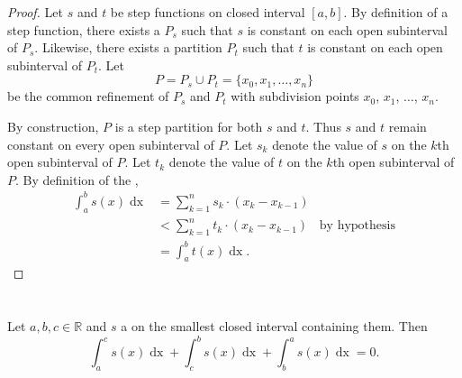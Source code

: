 \documentclass{report}
\begin{document}
\begin{proof}

  Let $s$ and $t$ be step functions on closed interval $[a, b]$.
  By definition of a step function, there exists a 
    $P_s$ such that $s$ is constant on each open subinterval of $P_s$.
  Likewise, there exists a partition $P_t$ such that $t$ is constant on each
    open subinterval of $P_t$.
  Let $$P = P_s \cup P_t = \{x_0, x_1, \ldots, x_n\}$$ be the common refinement
    of $P_s$ and $P_t$ with subdivision points $x_0$, $x_1$, $\ldots$, $x_n$.

  By construction, $P$ is a step partition for both $s$ and $t$.
  Thus $s$ and $t$ remain constant on every open subinterval of $P$.
  Let $s_k$ denote the value of $s$ on the $k$th open subinterval of $P$.
  Let $t_k$ denote the value of $t$ on the $k$th open subinterval of $P$.
  By definition of the ,
    \begin{align*}
      \int_a^b s(x) \mathop{dx}
        & = \sum_{k=1}^n s_k \cdot (x_k - x_{k-1}) \\
        & < \sum_{k=1}^n t_k \cdot (x_k - x_{k-1}) & \text{by hypothesis} \\
        & = \int_a^b t(x) \mathop{dx}.
    \end{align*}

\end{proof}

\section{}%
\label{sec:step-additivity-with-respect-interval-integration}

Let $a, b, c \in \mathbb{R}$ and $s$ a  on the
  smallest closed interval containing them.
Then
  $$\int_a^c s(x) \mathop{dx} + \int_c^b s(x) \mathop{dx} +
    \int_b^a s(x) \mathop{dx} = 0.$$
\end{document}
